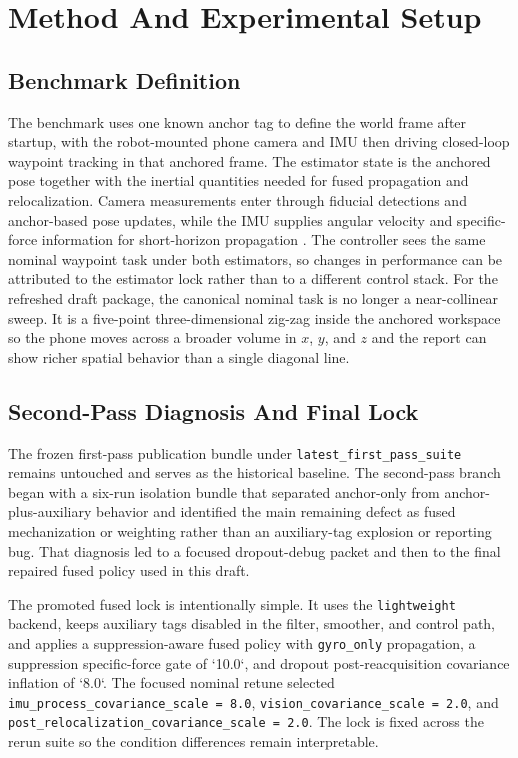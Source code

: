 \documentclass[11pt]{article}
\begin{document}
\section{Method And Experimental Setup}
\subsection{Benchmark Definition}
The benchmark uses one known anchor tag to define the world frame after startup, with the robot-mounted phone camera and IMU then driving closed-loop waypoint tracking in that anchored frame. The estimator state is the anchored pose together with the inertial quantities needed for fused propagation and relocalization. Camera measurements enter through fiducial detections and anchor-based pose updates, while the IMU supplies angular velocity and specific-force information for short-horizon propagation \cite{forster2017preintegration,nvidia_isaac_imu}. The controller sees the same nominal waypoint task under both estimators, so changes in performance can be attributed to the estimator lock rather than to a different control stack. For the refreshed draft package, the canonical nominal task is no longer a near-collinear sweep. It is a five-point three-dimensional zig-zag inside the anchored workspace so the phone moves across a broader volume in $x$, $y$, and $z$ and the report can show richer spatial behavior than a single diagonal line.

\subsection{Second-Pass Diagnosis And Final Lock}
The frozen first-pass publication bundle under \texttt{latest\_first\_pass\_suite} remains untouched and serves as the historical baseline. The second-pass branch began with a six-run isolation bundle that separated anchor-only from anchor-plus-auxiliary behavior and identified the main remaining defect as fused mechanization or weighting rather than an auxiliary-tag explosion or reporting bug. That diagnosis led to a focused dropout-debug packet and then to the final repaired fused policy used in this draft.

The promoted fused lock is intentionally simple. It uses the \texttt{lightweight} backend, keeps auxiliary tags disabled in the filter, smoother, and control path, and applies a suppression-aware fused policy with \texttt{gyro\_only} propagation, a suppression specific-force gate of `10.0`, and dropout post-reacquisition covariance inflation of `8.0`. The focused nominal retune selected \texttt{imu\_process\_covariance\_scale = 8.0}, \texttt{vision\_covariance\_scale = 2.0}, and \texttt{post\_relocalization\_covariance\_scale = 2.0}. The lock is fixed across the rerun suite so the condition differences remain interpretable.
\end{document}
